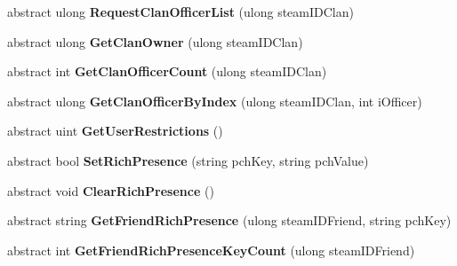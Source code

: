 \begin{DoxyCompactItemize}
abstract ulong {\bfseries Request\+Clan\+Officer\+List} (ulong steam\+I\+D\+Clan)
\item 
\mbox{\label{class_valve_1_1_steamworks_1_1_i_steam_friends_abddb536c31b66961d142cd956cf76b62}} 
abstract ulong {\bfseries Get\+Clan\+Owner} (ulong steam\+I\+D\+Clan)
\item 
\mbox{\label{class_valve_1_1_steamworks_1_1_i_steam_friends_a89334bf4829c25c7da60764c252e00ad}} 
abstract int {\bfseries Get\+Clan\+Officer\+Count} (ulong steam\+I\+D\+Clan)
\item 
\mbox{\label{class_valve_1_1_steamworks_1_1_i_steam_friends_ae1795eee065402ea109ec695b363d9b4}} 
abstract ulong {\bfseries Get\+Clan\+Officer\+By\+Index} (ulong steam\+I\+D\+Clan, int i\+Officer)
\item 
\mbox{\label{class_valve_1_1_steamworks_1_1_i_steam_friends_a2f5d27b7b66b2ba3da5580601a797727}} 
abstract uint {\bfseries Get\+User\+Restrictions} ()
\item 
\mbox{\label{class_valve_1_1_steamworks_1_1_i_steam_friends_a35930cc9a736396013edd14cbecac186}} 
abstract bool {\bfseries Set\+Rich\+Presence} (string pch\+Key, string pch\+Value)
\item 
\mbox{\label{class_valve_1_1_steamworks_1_1_i_steam_friends_a72984140b4663959455c3967975f3186}} 
abstract void {\bfseries Clear\+Rich\+Presence} ()
\item 
\mbox{\label{class_valve_1_1_steamworks_1_1_i_steam_friends_a8c1d3bff55336b86ae0a785c425e80d5}} 
abstract string {\bfseries Get\+Friend\+Rich\+Presence} (ulong steam\+I\+D\+Friend, string pch\+Key)
\item 
\mbox{\label{class_valve_1_1_steamworks_1_1_i_steam_friends_ad32a968cabd582adf738df0e9fa09ef4}} 
abstract int {\bfseries Get\+Friend\+Rich\+Presence\+Key\+Count} (ulong steam\+I\+D\+Friend)

\end{DoxyCompactItemize}
